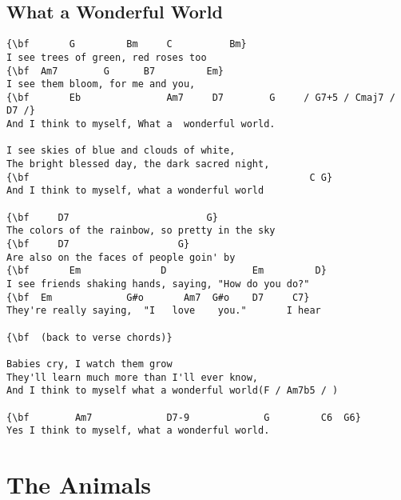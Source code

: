 \documentclass[a4paper]{article}
\begin{document}
\subsection{What a Wonderful World}
\begin{Verbatim}[commandchars=\\\{\}]
{\bf       G         Bm     C          Bm}
I see trees of green, red roses too
{\bf  Am7        G      B7         Em}
I see them bloom, for me and you,
{\bf       Eb               Am7     D7        G     / G7+5 / Cmaj7 / D7 /}
And I think to myself, What a  wonderful world.

I see skies of blue and clouds of white,
The bright blessed day, the dark sacred night,
{\bf                                                 C G}
And I think to myself, what a wonderful world

{\bf     D7                        G}
The colors of the rainbow, so pretty in the sky
{\bf     D7                   G}
Are also on the faces of people goin' by
{\bf       Em              D               Em         D}
I see friends shaking hands, saying, "How do you do?"
{\bf  Em             G#o       Am7  G#o    D7     C7}
They're really saying,  "I   love    you."       I hear

{\bf  (back to verse chords)}

Babies cry, I watch them grow
They'll learn much more than I'll ever know,
And I think to myself what a wonderful world(F / Am7b5 / )

{\bf        Am7             D7-9             G         C6  G6}
Yes I think to myself, what a wonderful world.

\end{Verbatim}
\newpage
\section{The Animals}
\end{document}
